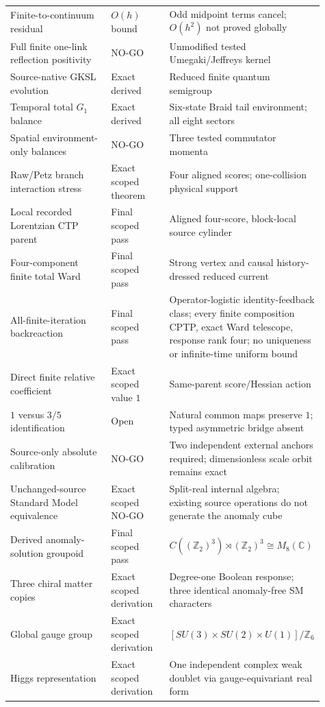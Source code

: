 \documentclass[11pt]{article}
\theoremstyle{definition}
\theoremstyle{remark}
\begin{document}
\begin{longtable}{>{\raggedright\arraybackslash}p{0.34\linewidth} >{\raggedright\arraybackslash}p{0.19\linewidth} >{\raggedright\arraybackslash}p{0.38\linewidth}}
Finite-to-continuum residual & $O(h)$ bound & Odd midpoint terms cancel; $O(h^2)$ not proved globally \\
Full finite one-link reflection positivity & NO-GO & Unmodified tested Umegaki/Jeffreys kernel \\
Source-native GKSL evolution & Exact derived & Reduced finite quantum semigroup \\
Temporal total $G_1$ balance & Exact derived & Six-state Braid tail environment; all eight sectors \\
Spatial environment-only balances & NO-GO & Three tested commutator momenta \\
Raw/Petz branch interaction stress & Exact scoped theorem & Four aligned scores; one-collision physical support \\
Local recorded Lorentzian CTP parent & Final scoped pass & Aligned four-score, block-local source cylinder \\
Four-component finite total Ward & Final scoped pass & Strong vertex and causal history-dressed reduced current \\
All-finite-iteration backreaction & Final scoped pass & Operator-logistic identity-feedback class; every finite composition CPTP, exact Ward telescope, response rank four; no uniqueness or infinite-time uniform bound \\
Direct finite relative coefficient & Exact scoped value $1$ & Same-parent score/Hessian action \\
$1$ versus $3/5$ identification & Open & Natural common maps preserve $1$; typed asymmetric bridge absent \\
Source-only absolute calibration & NO-GO & Two independent external anchors required; dimensionless scale orbit remains exact \\
Unchanged-source Standard Model equivalence & Exact scoped NO-GO & Split-real internal algebra; existing source operations do not generate the anomaly cube \\
Derived anomaly-solution groupoid & Final scoped pass & $C((\mathbb Z_2)^3)\rtimes(\mathbb Z_2)^3\cong M_8(\mathbb C)$ \\
Three chiral matter copies & Exact scoped derivation & Degree-one Boolean response; three identical anomaly-free SM characters \\
Global gauge group & Exact scoped derivation & $[SU(3)\times SU(2)\times U(1)]/\mathbb Z_6$ \\
Higgs representation & Exact scoped derivation & One independent complex weak doublet via gauge-equivariant real form \\

\end{longtable}
\end{document}
